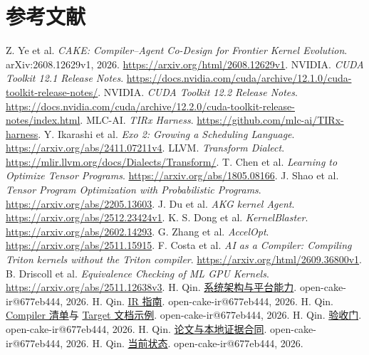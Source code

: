 \documentclass[UTF8,11pt,a4paper,fontset=none]{ctexart}
\makeatletter
\newcommand{\repo}[2]{\href{https://github.com/qhy991/open-cake-ir/blob/677eb444fec593294c470dcc5793262ae769fce2/#1}{#2}}
\newenvironment{reportbibliography}[1]
 {\list{\@biblabel{\@arabic\c@enumiv}}%
   {\settowidth\labelwidth{\@biblabel{#1}}%
    \leftmargin\labelwidth\advance\leftmargin\labelsep
    \usecounter{enumiv}\let\p@enumiv\@empty
    \renewcommand\theenumiv{\@arabic\c@enumiv}%
    \setlength\itemsep{0.25em}}%
  \raggedright\clubpenalty10000\widowpenalty10000\interlinepenalty10000}
 {\endlist}
\makeatother
\begin{document}
\section*{参考文献}
\begin{multicols}{2}
\footnotesize
\begin{reportbibliography}{99}
 Z. Ye et al. \emph{CAKE: Compiler--Agent Co-Design for Frontier Kernel Evolution}.
arXiv:2608.12629v1, 2026. \url{https://arxiv.org/html/2608.12629v1}.
 NVIDIA. \emph{CUDA Toolkit 12.1 Release Notes}.
\url{https://docs.nvidia.com/cuda/archive/12.1.0/cuda-toolkit-release-notes/}.
 NVIDIA. \emph{CUDA Toolkit 12.2 Release Notes}.
\url{https://docs.nvidia.com/cuda/archive/12.2.0/cuda-toolkit-release-notes/index.html}.
 MLC-AI. \emph{TIRx Harness}. \url{https://github.com/mlc-ai/TIRx-harness}.
 Y. Ikarashi et al. \emph{Exo 2: Growing a Scheduling Language}. \url{https://arxiv.org/abs/2411.07211v4}.
 LLVM. \emph{Transform Dialect}. \url{https://mlir.llvm.org/docs/Dialects/Transform/}.
 T. Chen et al. \emph{Learning to Optimize Tensor Programs}. \url{https://arxiv.org/abs/1805.08166}.
 J. Shao et al. \emph{Tensor Program Optimization with Probabilistic Programs}. \url{https://arxiv.org/abs/2205.13603}.
 J. Du et al. \emph{AKG kernel Agent}. \url{https://arxiv.org/abs/2512.23424v1}.
 K. S. Dong et al. \emph{KernelBlaster}. \url{https://arxiv.org/abs/2602.14293}.
 G. Zhang et al. \emph{AccelOpt}. \url{https://arxiv.org/abs/2511.15915}.
 F. Costa et al. \emph{AI as a Compiler: Compiling Triton kernels without the Triton compiler}. \url{https://arxiv.org/html/2609.36800v1}.
 B. Driscoll et al. \emph{Equivalence Checking of ML GPU Kernels}. \url{https://arxiv.org/abs/2511.12638v3}.
 H. Qin. \repo{docs/ARCHITECTURE.md}{系统架构与平台能力}. open-cake-ir@677eb444, 2026.
 H. Qin. \repo{docs/IR_GUIDE.md}{IR 指南}. open-cake-ir@677eb444, 2026.
 H. Qin. \repo{compiler/revision.json}{Compiler 清单}与
\repo{compiler/targets/sm_103a.json}{Target 文档示例}. open-cake-ir@677eb444, 2026.
 H. Qin. \repo{docs/ACCEPTANCE_GATES.md}{验收门}. open-cake-ir@677eb444, 2026.
 H. Qin. \repo{docs/PAPER_CONTRACT.md}{论文与本地证据合同}. open-cake-ir@677eb444, 2026.
 H. Qin. \repo{reports/current/STATUS.md}{当前状态}. open-cake-ir@677eb444, 2026.

\end{reportbibliography}
\end{multicols}
\end{document}
